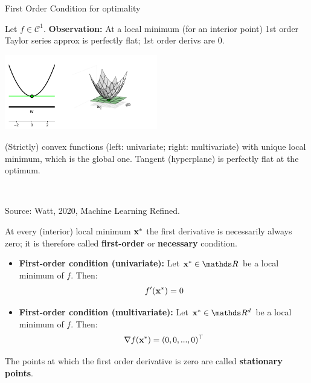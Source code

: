 \documentclass[11pt,compress,t,notes=noshow, xcolor=table]{beamer}
\begin{document}
  \begin{vbframe}{First Order Condition for optimality}
  
  Let $f \in \mathcal{C}^1$. \textbf{Observation: } At a local minimum (for an interior point) 1st order Taylor series approx is perfectly flat; 1st order derivs are $0$.

  \lz 
  
  \begin{center}
  \includegraphics[width = 0.5\textwidth]{figure_man/first_order.png} \\
  \begin{footnotesize}
  (Strictly) convex functions (left: univariate; right: multivariate) with unique local minimum, which is the global one. Tangent (hyperplane) is perfectly flat at the optimum. \end{footnotesize}\\
  \begin{tiny}
  Source: Watt, 2020, Machine Learning Refined. 
  \end{tiny}
  \end{center}
  
  \framebreak 
  
  At every (interior) local minimum $\mathbf{x}^\ast$ the first derivative is necessarily always zero; it is therefore called \textbf{first-order} or \textbf{necessary} condition. 
  
  \lz 

  \begin{itemize}
    \item \textbf{First-order condition (univariate): } Let $\xv^\ast \in \R$ be a local minimum of $f$. Then:
    $$
    f'(\mathbf{x}^\ast) = 0
    $$
    \item \textbf{First-order condition (multivariate): } Let $\xv^\ast \in \R^d$ be a local minimum of $f$. Then:
    $$
    \nabla f(\mathbf{x}^\ast) = (0, 0, ..., 0)^\top
    $$
  
  \end{itemize}
  
  The points at which the first order derivative is zero are called \textbf{stationary points}. 
  
  \framebreak 
  

\end{vbframe}
\end{document}
